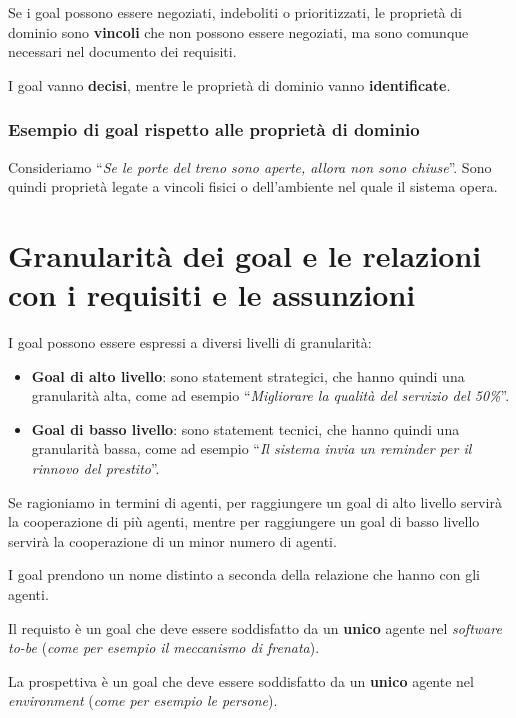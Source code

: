Se i goal possono essere negoziati, indeboliti o prioritizzati, le proprietà di
dominio sono \textbf{vincoli} che non possono essere negoziati, ma sono comunque 
necessari nel documento dei requisiti.

\begin{tcolorbox}
    I goal vanno \textbf{decisi}, mentre le proprietà di dominio vanno \textbf{identificate}.
\end{tcolorbox}
\subsubsection{Esempio di goal rispetto alle proprietà di dominio}
Consideriamo ``\textit{Se le porte del treno sono aperte, allora non sono 
chiuse}''. Sono quindi proprietà legate a vincoli fisici o dell'ambiente nel 
quale il sistema opera.
\section{Granularità dei goal e le relazioni con i requisiti e le assunzioni}
I goal possono essere espressi a diversi livelli di granularità:
\begin{itemize}
    \item \textbf{Goal di alto livello}: sono statement strategici, che hanno quindi 
    una granularità alta, come ad esempio ``\textit{Migliorare la qualità del servizio del 50\%}''.
    \item \textbf{Goal di basso livello}: sono statement tecnici, che hanno quindi
    una granularità bassa, come ad esempio ``\textit{Il sistema invia un reminder
    per il rinnovo del prestito}''.
\end{itemize}
Se ragioniamo in termini di agenti, per raggiungere un goal di alto livello
servirà la cooperazione di più agenti, mentre per raggiungere un goal di basso
livello servirà la cooperazione di un minor numero di agenti.

I goal prendono un nome distinto a seconda della relazione che hanno con gli agenti.
\begin{tcolorbox}[colback=lime!5!white,colframe=lime!75!black, title=Requisto]
    Il requisto è un goal che deve essere soddisfatto da un \textbf{unico} agente 
    nel \textit{software to-be} (\textit{come per esempio il meccanismo di frenata}).
\end{tcolorbox}
\begin{tcolorbox}[colback=orange!5!white,colframe=orange!75!black, title=Prospettiva]
    La prospettiva è un goal che deve essere soddisfatto da un \textbf{unico} agente 
    nel \textit{environment} (\textit{come per esempio le persone}).
\end{tcolorbox}
